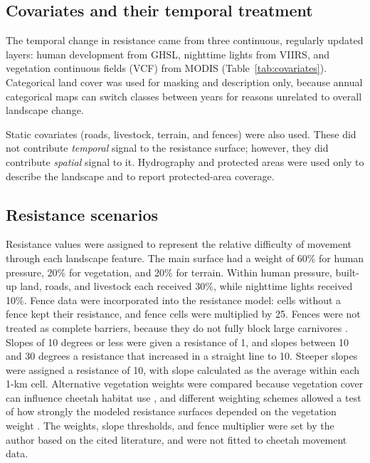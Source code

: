 \subsection{Covariates and their temporal treatment}
\label{sec:covariates}

The temporal change in resistance came from three continuous, regularly updated layers: human development from GHSL, nighttime lights from VIIRS, and vegetation continuous fields (VCF) from MODIS (Table~\ref{tab:covariates}). Categorical land cover was used for masking and description only, because annual categorical maps can switch classes between years for reasons unrelated to overall landscape change.

Static covariates (roads, livestock, terrain, and fences) were also used. These did not contribute \textit{temporal} signal to the resistance surface; however, they did contribute \textit{spatial} signal to it. Hydrography and protected areas were used only to describe the landscape and to report protected-area coverage.

\begin{table}[htbp]\centering
  \caption{Input layers, their data sources, how each was treated through time, and whether it entered the resistance surface.}
  \label{tab:covariates}
  
\end{table}

\subsection{Resistance scenarios}
\label{sec:resistance}

Resistance values were assigned to represent the relative difficulty of movement through each landscape feature. The main surface had a weight of 60\% for human pressure, 20\% for vegetation, and 20\% for terrain. Within human pressure, built-up land, roads, and livestock each received 30\%, while nighttime lights received 10\%. Fence data were incorporated into the resistance model: cells without a fence kept their resistance, and fence cells were multiplied by 25. Fences were not treated as complete barriers, because they do not fully block large carnivores \parencite{cozzi2013barriers}. Slopes of 10 degrees or less were given a resistance of 1, and slopes between 10 and 30 degrees a resistance that increased in a straight line to 10. Steeper slopes were assigned a resistance of 10, with slope calculated as the average within each 1-km cell. Alternative vegetation weights were compared because vegetation cover can influence cheetah habitat use \parencite{verschueren2024guild}, and different weighting schemes allowed a test of how strongly the modeled resistance surfaces depended on the vegetation weight \parencite{zeller2012resistance}. The weights, slope thresholds, and fence multiplier were set by the author based on the cited literature, and were not fitted to cheetah movement data.

